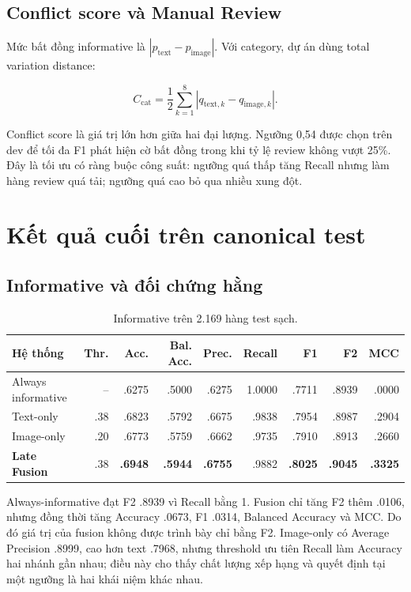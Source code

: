 \subsection{Conflict score và Manual Review}

Mức bất đồng informative là
\(|p_{\mathrm{text}}-p_{\mathrm{image}}|\). Với category, dự án dùng total
variation distance:

\[
C_{\mathrm{cat}}=\frac{1}{2}\sum_{k=1}^{8}
\left|q_{\mathrm{text},k}-q_{\mathrm{image},k}\right|.
\]

Conflict score là giá trị lớn hơn giữa hai đại lượng. Ngưỡng 0,54 được chọn trên
dev để tối đa F1 phát hiện cờ bất đồng trong khi tỷ lệ review không vượt 25\%.
Đây là tối ưu có ràng buộc công suất: ngưỡng quá thấp tăng Recall nhưng làm hàng
review quá tải; ngưỡng quá cao bỏ qua nhiều xung đột.

\section{Kết quả cuối trên canonical test}

\subsection{Informative và đối chứng hằng}

\begin{table}[H]\centering\scriptsize
\caption{Informative trên 2.169 hàng test sạch.}
\begin{tabular}{lrrrrrrrr}
\toprule
\textbf{Hệ thống} & \textbf{Thr.} & \textbf{Acc.} & \textbf{Bal. Acc.} &
\textbf{Prec.} & \textbf{Recall} & \textbf{F1} & \textbf{F2} & \textbf{MCC}\\
\midrule
Always informative & -- & .6275 & .5000 & .6275 & 1.0000 & .7711 & .8939 & .0000\\
Text-only & .38 & .6823 & .5792 & .6675 & .9838 & .7954 & .8987 & .2904\\
Image-only & .20 & .6773 & .5759 & .6662 & .9735 & .7910 & .8913 & .2660\\
\textbf{Late Fusion} & .38 & \textbf{.6948} & \textbf{.5944} & \textbf{.6755} &
.9882 & \textbf{.8025} & \textbf{.9045} & \textbf{.3325}\\
\bottomrule
\end{tabular}
\end{table}

Always-informative đạt F2 .8939 vì Recall bằng 1. Fusion chỉ tăng F2 thêm
.0106, nhưng đồng thời tăng Accuracy .0673, F1 .0314, Balanced Accuracy và MCC.
Do đó giá trị của fusion không được trình bày chỉ bằng F2. Image-only có Average
Precision .8999, cao hơn text .7968, nhưng threshold ưu tiên Recall làm Accuracy
hai nhánh gần nhau; điều này cho thấy chất lượng xếp hạng và quyết định tại một
ngưỡng là hai khái niệm khác nhau.

